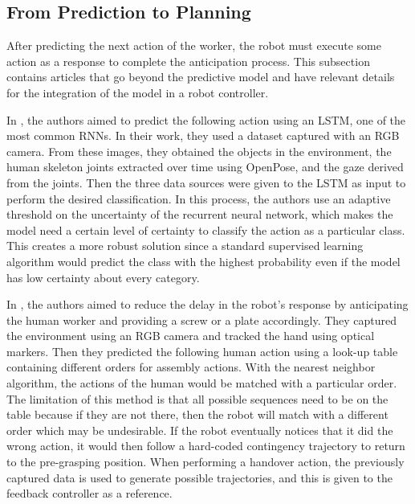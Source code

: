 \documentclass[conference]{IEEEtran}
\begin{document}
\subsection{From Prediction to Planning}

After predicting the next action of the worker, the robot must execute some action as a response to complete the anticipation process. This subsection contains articles that go beyond the predictive model and have relevant details for the integration of the model in a robot controller.

In \textcite{Canuto2021}, the authors aimed to predict the following action using an LSTM, one of the most common RNNs. In their work, they used a dataset captured with an RGB camera. From these images, they obtained the objects in the environment, the human skeleton joints extracted over time using OpenPose, and the gaze derived from the joints. Then the three data sources were given to the LSTM as input to perform the desired classification. In this process, the authors use an adaptive threshold on the uncertainty of the recurrent neural network, which makes the model need a certain level of certainty to classify the action as a particular class. This creates a more robust solution since a standard supervised learning algorithm would predict the class with the highest probability even if the model has low certainty about every category.

In \textcite{Maeda2016}, the authors aimed to reduce the delay in the robot’s response by anticipating the human worker and providing a screw or a plate accordingly. They captured the environment using an RGB camera and tracked the hand using optical markers. Then they predicted the following human action using a look-up table containing different orders for assembly actions. With the nearest neighbor algorithm, the actions of the human would be matched with a particular order. The limitation of this method is that all possible sequences need to be on the table because if they are not there, then the robot will match with a different order which may be undesirable. If the robot eventually notices that it did the wrong action, it would then follow a hard-coded contingency trajectory to return to the pre-grasping position. When performing a handover action, the previously captured data is used to generate possible trajectories, and this is given to the feedback controller as a reference.
\end{document}
